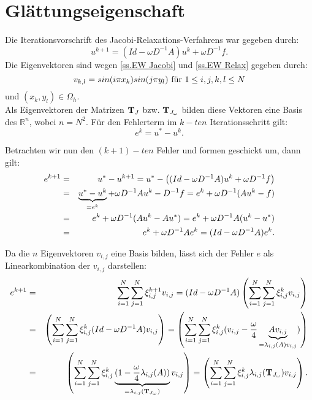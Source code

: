 \section{Glättungseigenschaft}\label{s.Glättungseigenschaft}

Die Iterationsvorschrift des Jacobi-Relaxations-Verfahrens war gegeben durch:
\begin{equation}
u^{k+1} = (Id - \omega D^{-1}A)u^{k} + \omega D^{-1}f.
\end{equation}
Die Eigenvektoren sind wegen \autoref{ss.EW Jacobi} und \autoref{ss.EW Relax} gegeben durch:
\begin{equation}
v_{k,l} = sin(i \pi x_{k})sin(j \pi y_{l}) \textnormal{ für } 1 \le i,j,k,l \le N
\end{equation}
und $(x_{k}, y_{l}) \in \Omega_{h}$. \\
Als Eigenvektoren der Matrizen ${\textbf{T}}_{J}$ bzw. ${\textbf{T}}_{J_{\omega}}$ bilden diese Vektoren eine Basis des $\mathbb{R}^{n}$, wobei $n = N^{2}$.
Für den Fehlerterm im $k-ten$ Iterationsschritt gilt:
\begin{equation}
e^{k} = u^{*} - u^{k}.
\end{equation}

Betrachten wir nun den $(k+1)-ten$ Fehler und formen geschickt um, dann gilt:
\begin{eqnarray}
e^{k+1} &=& u^{*} - u^{k+1} = u^{*} - \left( (Id - \omega D^{-1} A)u^{k} + \omega D^{-1}f \right) \notag \\
&=& \underbrace{u^{*} - u^{k}}_{= e^{k}} + \omega D^{-1} A u^{k} - D^{-1}f = e^{k} + \omega D^{-1} (Au^{k} - f) \notag \\
&=& e^{k} + \omega D^{-1} (Au^{k} - Au^{*}) = e^{k} + \omega D^{-1} A(u^{k} - u^{*}) \notag \\
&=& e^{k} + \omega D^{-1} A e^{k} = (Id - \omega D^{-1} A) e^{k}.
\end{eqnarray}


Da die $n$ Eigenvektoren $v_{i,j}$ eine Basis bilden, lässt sich der Fehler $e$ als Linearkombination der $v_{i,j}$ darstellen:
\begin{eqnarray}
e^{k+1} &=& \sum_{i = 1}^{N} \sum_{j = 1}^{N} \xi^{k+1}_{i,j} v_{i,j} = (Id - \omega D^{-1}A) \left(\sum_{i = 1}^{N} \sum_{j = 1}^{N} \xi^{k}_{i,j} v_{i,j}\right) \notag \\
&=& \left(\sum_{i = 1}^{N} \sum_{j = 1}^{N} \xi^{k}_{i,j} (Id - \omega D^{-1}A) v_{i,j}\right) = \left(\sum_{i = 1}^{N} \sum_{j = 1}^{N} \xi^{k}_{i,j} (v_{i,j} - \frac {\omega} {4} \underbrace{A v_{i,j}}_{= \lambda_{i,j}(A)v_{i,j}})\right) \notag \\
&=& \left(\sum_{i = 1}^{N} \sum_{j = 1}^{N} \xi^{k}_{i,j} \underbrace{(1 - \frac {\omega} {4} \lambda_{i,j}(A))}_{= \lambda_{i,j}({\textbf{T}}_{J_{\omega}})} v_{i,j}\right) = \left(\sum_{i = 1}^{N} \sum_{j = 1}^{N} \xi^{k}_{i,j} \lambda_{i,j}({\textbf{T}}_{J_{\omega}}) v_{i,j}\right).
\end{eqnarray}

